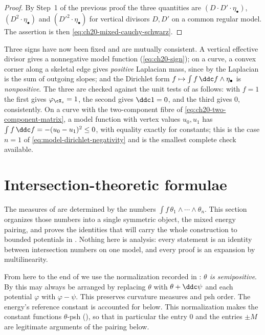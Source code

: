 \begin{proof}
By Step~1 of the previous proof the three quantities are
$(D\cdot D'\cdot\eta_\bullet)$, $(D^2\cdot\eta_\bullet)$ and
$(D'^2\cdot\eta_\bullet)$ for vertical divisors $D,D'$ on a common
regular model.  The assertion is then
\eqref{eq:ch20-mixed-cauchy-schwarz}.
\end{proof}

\begin{remark}
\label{rem:ch24-sign-audit}
Three signs have now been fixed and are mutually consistent.  A vertical
effective divisor gives a nonnegative model function
(\eqref{eq:ch20-sign}); on a curve, a convex corner along a skeletal
edge gives \emph{positive} Laplacian mass, since by
 the Laplacian is the sum of outgoing
slopes; and the Dirichlet form
$f\mapsto\int f\,\ddc f\wedge\eta_\bullet$ is \emph{nonpositive}.  The
three are checked against the unit tests of  as
follows: with $f=1$ the first gives $\varphi_{\cX_s}=1$, the second
gives $\ddc1=0$, and the third gives $0$, consistently.  On a curve
with the two-component fibre of \eqref{eq:ch20-two-component-matrix}, a
model function with vertex values $u_0,u_1$ has
$\int f\,\ddc f=-(u_0-u_1)^2\leq0$, with equality exactly for constants;
this is the case $n=1$ of \eqref{eq:model-dirichlet-negativity} and is the
smallest complete check available.
\end{remark}

\section{Intersection-theoretic formulae}
\label{sec:ch24-formulae}

The measures of  are determined by the numbers
$\int f\,\theta_1\wedge\cdots\wedge\theta_n$.  This section organizes those
numbers into a single symmetric object, the mixed energy pairing, and
proves the identities that will carry the whole construction to bounded
potentials in .  Nothing here is analysis: every
statement is an identity between intersection numbers on one model, and
every proof is an expansion by multilinearity.

From here to the end of  we use the normalization
recorded in : \emph{$\theta$ is semipositive}.
By  this may always be arranged by
replacing $\theta$ with $\theta+\ddc\psi$ and each potential
$\varphi$ with $\varphi-\psi$.  This preserves curvature measures and
psh order.  The energy's reference constant is accounted for below.
This normalization makes the constant functions $\theta$-psh
(), so that in particular the entry $0$ and the
entries $\pm M$ are legitimate arguments of the pairing below.

